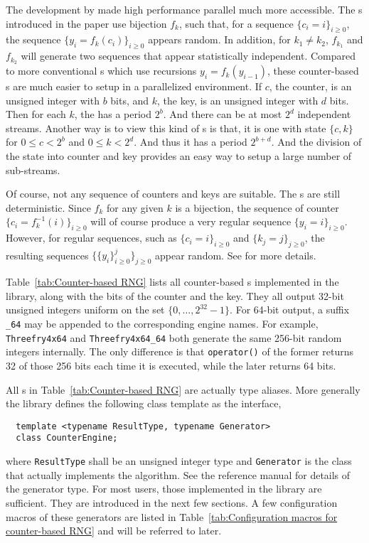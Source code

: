 The development by \cite{Salmon:2011um} made high performance parallel \rng
much more accessible. The \rng{}s introduced in the paper use bijection $f_k$,
such that, for a sequence $\{c_i = i\}_{i\ge0}$, the sequence $\{y_i =
f_k(c_i)\}_{i\ge0}$ appears random. In addition, for $k_1 \ne k_2$, $f_{k_1}$
and $f_{k_2}$ will generate two sequences that appear statistically
independent. Compared to more conventional \rng{}s which use recursions $y_i =
f_k(y_{i - 1})$, these counter-based \rng{}s are much easier to setup in a
parallelized environment. If $c$, the counter, is an unsigned integer with $b$
bits, and $k$, the key, is an unsigned integer with $d$ bits. Then for each
$k$, the \rng has a period $2^b$. And there can be at most $2^d$ independent
streams. Another way is to view this kind of \rng{}s is that, it is one \rng{}
with state $\{c, k\}$ for $0 \le c < 2^b$ and $0 \le k < 2^d$. And thus it has
a period $2^{b + d}$. And the division of the state into counter and key
provides an easy way to setup a large number of sub-streams.

Of course, not any sequence of counters and keys are suitable. The \rng{}s are
still deterministic. Since $f_k$ for any given $k$ is a bijection, the sequence
of counter $\{c_i = f_k^{-1}(i)\}_{i\ge0}$ will of course produce a very
regular sequence $\{y_i = i\}_{i\ge0}$. However, for regular sequences, such as
$\{c_i = i\}_{i\ge0}$ and $\{k_j = j\}_{j\ge0}$, the resulting sequences
$\{\{y_i\}_{i\ge0}^j\}_{j\ge0}$ appear random. See \cite{Salmon:2011um} for
more details.

Table~\ref{tab:Counter-based RNG} lists all counter-based \rng{}s implemented
in the library, along with the bits of the counter and the key. They all output
32-bit unsigned integers uniform on the set $\{0,\dots,2^{32}-1\}$. For 64-bit
output, a suffix \verb|_64| may be appended to the corresponding \rng engine
names. For example, \verb|Threefry4x64| and \verb|Threefry4x64_64| both
generate the same 256-bit random integers internally. The only difference is
that \verb|operator()| of the former returns 32 of those 256 bits each time it
is executed, while the later returns 64 bits.

All \rng{}s in Table~\ref{tab:Counter-based RNG} are actually type aliases.
More generally the library defines the following class template as the
interface,
\begin{Verbatim}
  template <typename ResultType, typename Generator>
  class CounterEngine;
\end{Verbatim}
where \verb|ResultType| shall be an unsigned integer type and \verb|Generator|
is the class that actually implements the algorithm. See the reference manual
for details of the generator type. For most users, those implemented in the
library are sufficient. They are introduced in the next few sections. A few
configuration macros of these generators are listed in
Table~\ref{tab:Configuration macros for counter-based RNG} and will be referred
to later.

